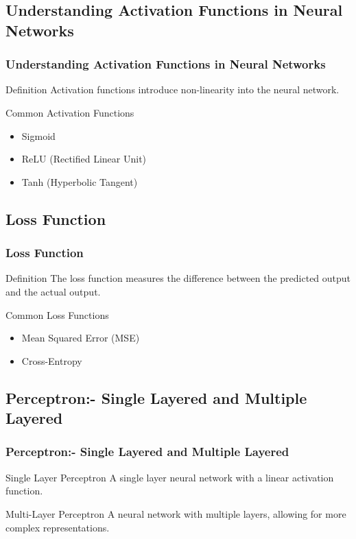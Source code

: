 \documentclass[aspectratio=169, hideothersubsections]{beamer}
\begin{document}
\subsection{Understanding Activation Functions in Neural Networks}
\begin{frame}
    \frametitle{Understanding Activation Functions in Neural Networks}
    \begin{block}{Definition}
        Activation functions introduce non-linearity into the neural network.
    \end{block}
    \begin{block}{Common Activation Functions}
        \begin{itemize}
            \item Sigmoid
            \item ReLU (Rectified Linear Unit)
            \item Tanh (Hyperbolic Tangent)
        \end{itemize}
    \end{block}
\end{frame}

\subsection{Loss Function}
\begin{frame}
    \frametitle{Loss Function}
    \begin{block}{Definition}
        The loss function measures the difference between the predicted output and the actual output.
    \end{block}
    \begin{block}{Common Loss Functions}
        \begin{itemize}
            \item Mean Squared Error (MSE)
            \item Cross-Entropy
        \end{itemize}
    \end{block}
\end{frame}

\subsection{Perceptron:- Single Layered and Multiple Layered}
\begin{frame}
    \frametitle{Perceptron:- Single Layered and Multiple Layered}
    \begin{block}{Single Layer Perceptron}
        A single layer neural network with a linear activation function.
    \end{block}
    \begin{block}{Multi-Layer Perceptron}
        A neural network with multiple layers, allowing for more complex representations.
    \end{block}
\end{frame}
\end{document}
